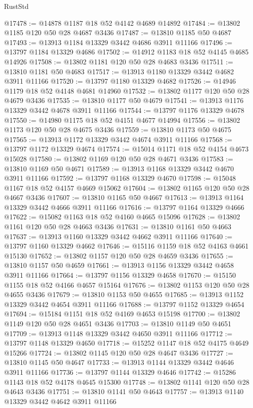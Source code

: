 \begin{lexlean}{RustStd}
\begin{coremodule}
@17478 := @14878 @1187 @18 @52 @4142 @4689 @14892
@17484 := @13802 @1185 @120 @50 @28 @4687 @3436
@17487 := @13810 @1185 @50 @4687
@17493 := @13913 @1184 @13329 @3442 @4686 @3911 @11166
@17496 := @13797 @1184 @13329 @4686
@17502 := @14912 @1183 @18 @52 @4145 @4685 @14926
@17508 := @13802 @1181 @120 @50 @28 @4683 @3436
@17511 := @13810 @1181 @50 @4683
@17517 := @13913 @1180 @13329 @3442 @4682 @3911 @11166
@17520 := @13797 @1180 @13329 @4682
@17526 := @14946 @1179 @18 @52 @4148 @4681 @14960
@17532 := @13802 @1177 @120 @50 @28 @4679 @3436
@17535 := @13810 @1177 @50 @4679
@17541 := @13913 @1176 @13329 @3442 @4678 @3911 @11166
@17544 := @13797 @1176 @13329 @4678
@17550 := @14980 @1175 @18 @52 @4151 @4677 @14994
@17556 := @13802 @1173 @120 @50 @28 @4675 @3436
@17559 := @13810 @1173 @50 @4675
@17565 := @13913 @1172 @13329 @3442 @4674 @3911 @11166
@17568 := @13797 @1172 @13329 @4674
@17574 := @15014 @1171 @18 @52 @4154 @4673 @15028
@17580 := @13802 @1169 @120 @50 @28 @4671 @3436
@17583 := @13810 @1169 @50 @4671
@17589 := @13913 @1168 @13329 @3442 @4670 @3911 @11166
@17592 := @13797 @1168 @13329 @4670
@17598 := @15048 @1167 @18 @52 @4157 @4669 @15062
@17604 := @13802 @1165 @120 @50 @28 @4667 @3436
@17607 := @13810 @1165 @50 @4667
@17613 := @13913 @1164 @13329 @3442 @4666 @3911 @11166
@17616 := @13797 @1164 @13329 @4666
@17622 := @15082 @1163 @18 @52 @4160 @4665 @15096
@17628 := @13802 @1161 @120 @50 @28 @4663 @3436
@17631 := @13810 @1161 @50 @4663
@17637 := @13913 @1160 @13329 @3442 @4662 @3911 @11166
@17640 := @13797 @1160 @13329 @4662
@17646 := @15116 @1159 @18 @52 @4163 @4661 @15130
@17652 := @13802 @1157 @120 @50 @28 @4659 @3436
@17655 := @13810 @1157 @50 @4659
@17661 := @13913 @1156 @13329 @3442 @4658 @3911 @11166
@17664 := @13797 @1156 @13329 @4658
@17670 := @15150 @1155 @18 @52 @4166 @4657 @15164
@17676 := @13802 @1153 @120 @50 @28 @4655 @3436
@17679 := @13810 @1153 @50 @4655
@17685 := @13913 @1152 @13329 @3442 @4654 @3911 @11166
@17688 := @13797 @1152 @13329 @4654
@17694 := @15184 @1151 @18 @52 @4169 @4653 @15198
@17700 := @13802 @1149 @120 @50 @28 @4651 @3436
@17703 := @13810 @1149 @50 @4651
@17709 := @13913 @1148 @13329 @3442 @4650 @3911 @11166
@17712 := @13797 @1148 @13329 @4650
@17718 := @15252 @1147 @18 @52 @4175 @4649 @15266
@17724 := @13802 @1145 @120 @50 @28 @4647 @3436
@17727 := @13810 @1145 @50 @4647
@17733 := @13913 @1144 @13329 @3442 @4646 @3911 @11166
@17736 := @13797 @1144 @13329 @4646
@17742 := @15286 @1143 @18 @52 @4178 @4645 @15300
@17748 := @13802 @1141 @120 @50 @28 @4643 @3436
@17751 := @13810 @1141 @50 @4643
@17757 := @13913 @1140 @13329 @3442 @4642 @3911 @11166

\end{coremodule}
\end{lexlean}
